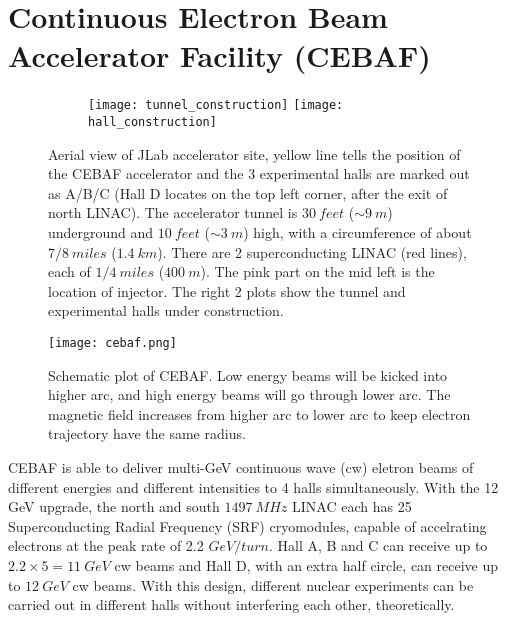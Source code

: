 \section{Continuous Electron Beam Accelerator Facility (CEBAF)}
\begin{figure}[h!]
    \begin{subfigure}[b]{0.59\textwidth}
    \end{subfigure}
    \begin{subfigure}[b]{0.5\textwidth}
	\texttt{[image: tunnel\_construction]}
	\texttt{[image: hall\_construction]}
    \end{subfigure}

    \caption{Aerial view of JLab accelerator site, yellow line tells the position
    of the CEBAF accelerator and the 3 experimental halls are marked out as A/B/C 
    (Hall D locates on the top left corner, after the exit of north LINAC).
    The accelerator tunnel is $30 \ feet$ ($\sim 9 \ m$) underground and $10 \ feet$ ($\sim 3 \ m$) 
    high, with a circumference of about $7/8\ miles$ ($1.4\ km$). There are 2 superconducting 
    LINAC (red lines), each of $1/4\ miles$ ($400\ m$). The pink part on the mid
    left is the location of injector. The right 2 plots show the tunnel and 
    experimental halls under construction.}
\end{figure}

\begin{figure}[h!]
    \texttt{[image: cebaf.png]}
    \caption{Schematic plot of CEBAF. Low energy beams will be kicked into 
    higher arc, and high energy beams will go through lower arc. The magnetic
    field increases from higher arc to lower arc to keep electron trajectory 
    have the same radius.}
    \label{fig:cebaf}
\end{figure}
CEBAF is able to deliver multi-GeV continuous wave (cw) eletron beams of different
energies and different intensities to 4 halls simultaneously.
With the 12 GeV upgrade, the north and south $1497\ MHz$ LINAC each has 25 
Superconducting Radial Frequency (SRF) cryomodules, capable of accelrating 
electrons at the peak rate of 2.2 $GeV/turn$. Hall A, B and C can receive up
to $2.2 \times 5 = 11 \ GeV$ cw beams and Hall D, with an extra half circle,
can receive up to $12\ GeV$ cw beams. With this design, different nuclear 
experiments can be carried out in different halls without interfering each other,
theoretically.

